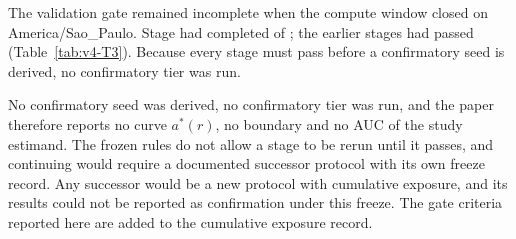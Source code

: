 The validation gate remained incomplete when the compute window closed on  America/Sao\_Paulo. Stage  had completed  of  ; the earlier stages had passed (Table~\ref{tab:v4-T3}). %
Because every stage must pass before a confirmatory seed is derived, no confirmatory tier was run. %


No confirmatory seed was derived, no confirmatory tier was run, and the paper therefore reports no curve $a^*(r)$, no boundary and no AUC of the study estimand. %
The frozen rules do not allow a stage to be rerun until it passes, and continuing would require a documented successor protocol with its own freeze record. %
Any successor would be a new protocol with cumulative exposure, and its results could not be reported as confirmation under this freeze. %
The gate criteria reported here are added to the cumulative exposure record. %


